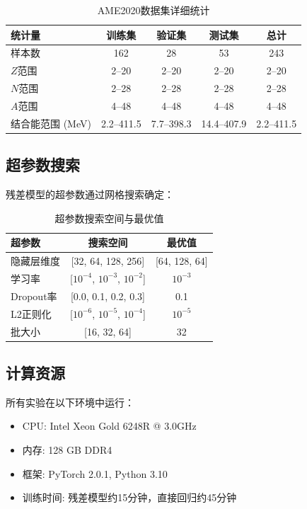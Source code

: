 \documentclass[12pt, a4paper]{article}
\begin{document}
\begin{table}[htbp]
  \centering
  \caption{AME2020数据集详细统计}
  \begin{tabular}{lcccc}
    \toprule
    \textbf{统计量} & \textbf{训练集} & \textbf{验证集} & \textbf{测试集} & \textbf{总计} \\
    \midrule
    样本数 & 162 & 28 & 53 & 243 \\
    $Z$范围 & 2--20 & 2--20 & 2--20 & 2--20 \\
    $N$范围 & 2--28 & 2--28 & 2--28 & 2--28 \\
    $A$范围 & 4--48 & 4--48 & 4--48 & 4--48 \\
    结合能范围 (MeV) & 2.2--411.5 & 7.7--398.3 & 14.4--407.9 & 2.2--411.5 \\
    \bottomrule
  \end{tabular}
\end{table}

\subsection{超参数搜索}

残差模型的超参数通过网格搜索确定：

\begin{table}[htbp]
  \centering
  \caption{超参数搜索空间与最优值}
  \begin{tabular}{lcc}
    \toprule
    \textbf{超参数} & \textbf{搜索空间} & \textbf{最优值} \\
    \midrule
    隐藏层维度 & [32, 64, 128, 256] & [64, 128, 64] \\
    学习率 & [$10^{-4}$, $10^{-3}$, $10^{-2}$] & $10^{-3}$ \\
    Dropout率 & [0.0, 0.1, 0.2, 0.3] & 0.1 \\
    L2正则化 & [$10^{-6}$, $10^{-5}$, $10^{-4}$] & $10^{-5}$ \\
    批大小 & [16, 32, 64] & 32 \\
    \bottomrule
  \end{tabular}
\end{table}

\subsection{计算资源}

所有实验在以下环境中运行：
\begin{itemize}
  \item CPU: Intel Xeon Gold 6248R @ 3.0GHz
  \item 内存: 128 GB DDR4
  \item 框架: PyTorch 2.0.1, Python 3.10
  \item 训练时间: 残差模型约15分钟，直接回归约45分钟
\end{itemize}
\end{document}
